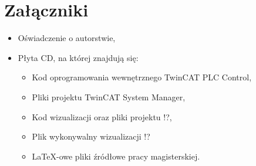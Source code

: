 \section{Załączniki}
\begin{itemize}
\item Oświadczenie o autorstwie,
\item Płyta CD, na której znajdują się:
\begin{itemize}
\item Kod oprogramowania wewnętrznego TwinCAT PLC Control,
\item Pliki projektu TwinCAT System Manager,
\item Kod wizualizacji oraz pliki projektu !?,
\item Plik wykonywalny wizualizacji !?
\item \LaTeX-owe pliki źródłowe pracy magisterskiej.
\end{itemize}
\end{itemize}
